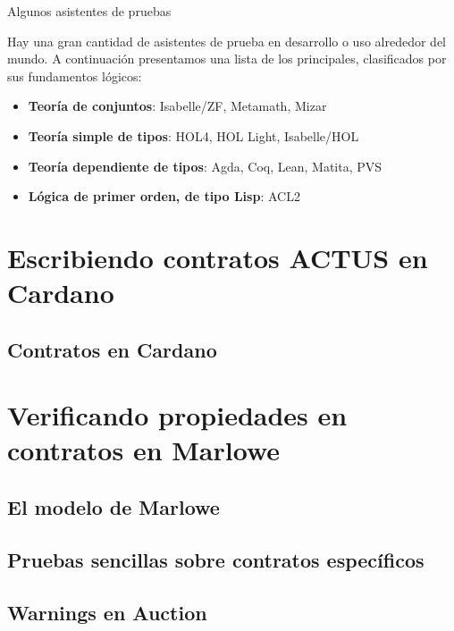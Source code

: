 \documentclass{beamer}
\begin{document}
\begin{frame}{Algunos asistentes de pruebas}

Hay una gran cantidad de asistentes de prueba en desarrollo o uso alrededor del mundo. A
continuación presentamos una lista de los principales, clasificados por sus fundamentos lógicos:
\medskip
\pause

\begin{itemize}
    \item \textbf{Teoría de conjuntos}: Isabelle/ZF, Metamath, Mizar
    \item \textbf{Teoría simple de tipos}: HOL4, HOL Light, Isabelle/HOL
    \item \textbf{Teoría dependiente de tipos}: Agda, Coq, Lean, Matita, PVS
    \item \textbf{Lógica de primer orden, de tipo Lisp}: ACL2
\end{itemize}
\end{frame}

\section{Escribiendo contratos ACTUS en Cardano}

\subsection{Contratos en Cardano}

\begin{frame}

\end{frame}

\section{Verificando propiedades en contratos en Marlowe}

\subsection{El modelo de Marlowe}

\subsection{Pruebas sencillas sobre contratos específicos}

\subsection{Warnings en Auction}
\end{document}
